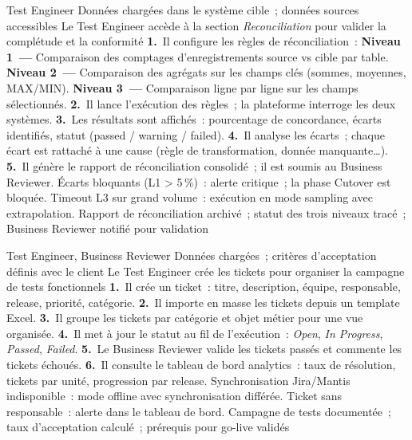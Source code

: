   {Test Engineer}
  {Données chargées dans le système cible~; données sources accessibles}
  {Le Test Engineer accède à la section \textit{Reconciliation} pour valider la complétude et la conformité}
  {\textbf{1.}~Il configure les règles de réconciliation~:\newline
   \quad\textbf{Niveau 1~---} Comparaison des comptages d'enregistrements source vs cible par table.\newline
   \quad\textbf{Niveau 2~---} Comparaison des agrégats sur les champs clés (sommes, moyennes, MAX/MIN).\newline
   \quad\textbf{Niveau 3~---} Comparaison ligne par ligne sur les champs sélectionnés.\newline
   \textbf{2.}~Il lance l'exécution des règles~; la plateforme interroge les deux systèmes.\newline
   \textbf{3.}~Les résultats sont affichés~: pourcentage de concordance, écarts identifiés, statut (passed / warning / failed).\newline
   \textbf{4.}~Il analyse les écarts~; chaque écart est rattaché à une cause (règle de transformation, donnée manquante\ldots).\newline
   \textbf{5.}~Il génère le rapport de réconciliation consolidé~; il est soumis au Business Reviewer.}
  {Écarts bloquants (L1 > 5\,\%)~: alerte critique~; la phase Cutover est bloquée. Timeout L3 sur grand volume~: exécution en mode sampling avec extrapolation.}
  {Rapport de réconciliation archivé~; statut des trois niveaux tracé~; Business Reviewer notifié pour validation}

  {Test Engineer, Business Reviewer}
  {Données chargées~; critères d'acceptation définis avec le client}
  {Le Test Engineer crée les tickets pour organiser la campagne de tests fonctionnels}
  {\textbf{1.}~Il crée un ticket~: titre, description, équipe, responsable, release, priorité, catégorie.\newline
   \textbf{2.}~Il importe en masse les tickets depuis un template Excel.\newline
   \textbf{3.}~Il groupe les tickets par catégorie et objet métier pour une vue organisée.\newline
   \textbf{4.}~Il met à jour le statut au fil de l'exécution~: \textit{Open}, \textit{In Progress}, \textit{Passed}, \textit{Failed}.\newline
   \textbf{5.}~Le Business Reviewer valide les tickets passés et commente les tickets échoués.\newline
   \textbf{6.}~Il consulte le tableau de bord analytics~: taux de résolution, tickets par unité, progression par release.}
  {Synchronisation Jira/Mantis indisponible~: mode offline avec synchronisation différée. Ticket sans responsable~: alerte dans le tableau de bord.}
  {Campagne de tests documentée~; taux d'acceptation calculé~; prérequis pour go-live validés}
\fi %

